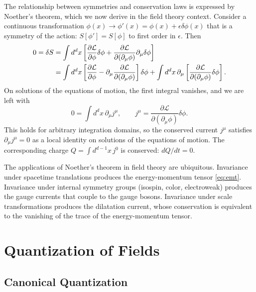 \documentclass[11pt, twoside, openright]{book}
\theoremstyle{dotted}
\theoremstyle{definition}
\begin{document}
The relationship between symmetries and conservation laws is expressed by Noether's
theorem, which we now derive in the field theory context. Consider a continuous
transformation $\phi(x) \to \phi'(x) = \phi(x) + \epsilon \delta\phi(x)$ that is
a symmetry of the action: $S[\phi'] = S[\phi]$ to first order in $\epsilon$. Then
\begin{align}
  0 = \delta S &= \int d^dx \left[
    \frac{\partial\mathcal{L}}{\partial\phi}\delta\phi
    + \frac{\partial\mathcal{L}}{\partial(\partial_\mu\phi)}\partial_\mu\delta\phi
  \right] \notag \\
  &= \int d^dx \left[
    \frac{\partial\mathcal{L}}{\partial\phi}
    - \partial_\mu\frac{\partial\mathcal{L}}{\partial(\partial_\mu\phi)}
  \right]\delta\phi
  + \int d^dx \, \partial_\mu\left[
    \frac{\partial\mathcal{L}}{\partial(\partial_\mu\phi)}\delta\phi
  \right].
\end{align}
On solutions of the equations of motion, the first integral vanishes, and we are
left with
\begin{equation}
  0 = \int d^dx \, \partial_\mu j^\mu, \qquad
  j^\mu = \frac{\partial\mathcal{L}}{\partial(\partial_\mu\phi)}\delta\phi.
  \label{eq:noether_current}
\end{equation}
This holds for arbitrary integration domains, so the conserved current $j^\mu$
satisfies $\partial_\mu j^\mu = 0$ as a local identity on solutions of the
equations of motion. The corresponding charge $Q = \int d^{d-1}x \, j^0$ is
conserved: $dQ/dt = 0$.

The applications of Noether's theorem in field theory are ubiquitous. Invariance
under spacetime translations produces the energy-momentum tensor \eqref{eq:emt}.
Invariance under internal symmetry groups (isospin, color, electroweak) produces
the gauge currents that couple to the gauge bosons. Invariance under scale
transformations produces the dilatation current, whose conservation is equivalent
to the vanishing of the trace of the energy-momentum tensor.

\chapter{Quantization of Fields}
\label{ch:quantization}

\section{Canonical Quantization}
\end{document}
